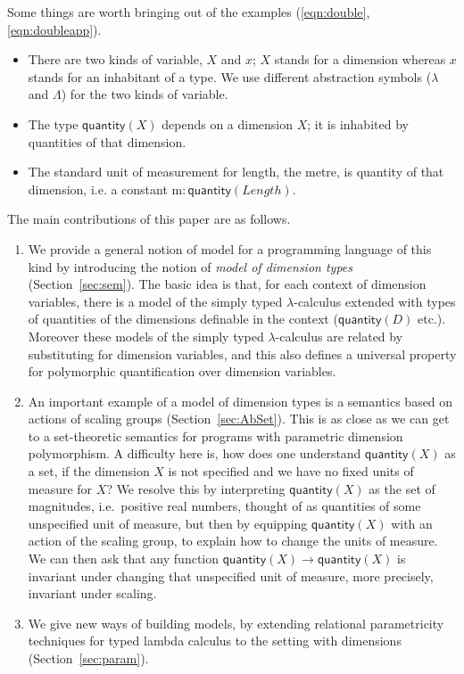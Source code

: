 \documentclass[a4paper,UKenglish]{lipics}
\newcommand{\msf}[1]{\mathsf{#1}} %
\newcommand{\num}{\msf{quantity}}
\newcommand{\length}{\mathit{Length}}
\newcommand{\Dvar}{X}
\begin{document}
Some things are worth bringing out of the examples (\eqref{eqn:double},\eqref{eqn:doubleapp}).
\begin{itemize}
\item There are two kinds of variable, $\Dvar$ and $x$;
$\Dvar$ stands for a dimension whereas $x$ stands for an inhabitant of a type.
We use different abstraction symbols ($\lambda$ and $\Lambda$)
for the two kinds of variable.
\item The type $\num(\Dvar)$ depends on a dimension $\Dvar$; it
  is inhabited by quantities of that dimension.
\item The standard unit of measurement for length, the metre, is
  quantity of that dimension, i.e. a constant $\mathrm m:\num(\length)$.
\end{itemize}

The main contributions of this paper are as follows.
\begin{enumerate}
\item We provide a general notion of model for a programming language
  of this kind by introducing the notion of \emph{model of dimension types}
  (Section~\ref{sec:sem}).
  The basic idea is that, for each context of dimension variables,
  there is a model of the simply typed $\lambda$-calculus extended with
  types of quantities of the dimensions definable in
  the context ($\num(D)$ etc.).
  Moreover these models of the simply typed $\lambda$-calculus
  are related by substituting for dimension variables,
  and this also defines a universal property for polymorphic quantification
  over dimension variables.
\item An important example of a model of dimension types is
  a semantics based
  on actions of scaling groups (Section~\ref{sec:AbSet}).
  This is as close as we can get to
  a set-theoretic semantics for programs with parametric dimension polymorphism.
  A difficulty here is, how does one understand $\num(\Dvar)$ as a set,
  if the dimension $\Dvar$ is not specified and we have
  no fixed units of measure for $\Dvar$?
  We resolve this by interpreting
  $\num(\Dvar)$ as the set of magnitudes, i.e.~positive real numbers,
  thought of as quantities of some unspecified unit of measure,
  but then by equipping $\num(\Dvar)$ with an action of the scaling group,
  to explain how to change the units of measure.
  We can then ask that
  any function $\num(\Dvar)\to\num(\Dvar)$
  is invariant under changing that unspecified unit of measure,
  more precisely, invariant under scaling.
\item We give new ways of building models, by extending
  relational parametricity
  techniques for typed lambda calculus to the setting with
  dimensions (Section~\ref{sec:param}).
\end{enumerate}
\end{document}
